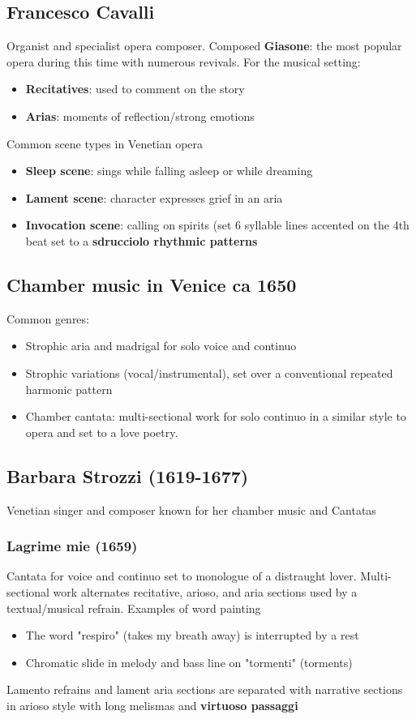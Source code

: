 \documentclass{article}
\begin{document}
  \subsection{Francesco Cavalli}
  Organist and specialist opera composer. Composed \textbf{Giasone}: the most popular opera during this time with numerous revivals. For the musical setting:
  \begin{itemize}
    \item \textbf{Recitatives}: used to comment on the story
    \item \textbf{Arias}: moments of reflection/strong emotions
  \end{itemize}
  Common scene types in Venetian opera
  \begin{itemize}
    \item \textbf{Sleep scene}: sings while falling asleep or while dreaming
    \item \textbf{Lament scene}: character expresses grief in an aria
    \item \textbf{Invocation scene}: calling on spirits (set 6 syllable lines accented on the 4th beat set to a \textbf{sdrucciolo rhythmic patterns}
  \end{itemize}
  \subsection{Chamber music in Venice ca 1650}
  Common genres:
  \begin{itemize}
    \item Strophic aria and madrigal for solo voice and continuo
    \item Strophic variations (vocal/instrumental), set over a conventional repeated harmonic pattern
    \item Chamber cantata: multi-sectional work for solo continuo in a similar style to opera and set to a love poetry.
  \end{itemize}
  \subsection{Barbara Strozzi (1619-1677)}
  Venetian singer and composer known for her chamber music and Cantatas
  \subsubsection{Lagrime mie (1659)}
  Cantata for voice and continuo set to monologue of a distraught lover. Multi-sectional work alternates recitative, arioso, and aria sections used by a textual/musical refrain. Examples of word painting
  \begin{itemize}
    \item The word "respiro" (takes my breath away) is interrupted by a rest
    \item Chromatic slide in melody and bass line on "tormenti" (torments)
  \end{itemize}
  Lamento refrains and lament aria sections are separated with narrative sections in arioso style with long melismas and \textbf{virtuoso passaggi}
\end{document}

